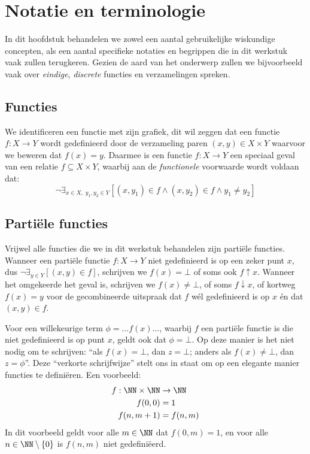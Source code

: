 \chapter{Notatie en terminologie}

In dit hoofdstuk behandelen we zowel een aantal gebruikelijke wiskundige concepten, als een aantal specifieke notaties en begrippen die in dit werkstuk vaak zullen terugkeren. Gezien de aard van het onderwerp zullen we bijvoorbeeld vaak over \emph{eindige}, \emph{discrete} functies en verzamelingen spreken.

\section{Functies}

We identificeren een functie met zijn grafiek, dit wil zeggen dat een functie $f : X \to Y$ wordt gedefinieerd door de verzameling paren $(x, y) \in X \times Y$ waarvoor we beweren dat $f(x) = y$. Daarmee is een functie $f : X \to Y$ een speciaal geval van een relatie $f \subseteq X \times Y$, waarbij aan de \emph{functionele} voorwaarde wordt voldaan dat:
%
\begin{equation*}
  \neg \exists_{x \in X,\; y_1,y_2 \in Y} \left[ (x, y_1) \in f \land (x, y_2) \in f \land y_1 \neq y_2 \right]
\end{equation*}

\section{Partiële functies}

Vrijwel alle functies die we in dit werkstuk behandelen zijn partiële functies. Wanneer een partiële functie $f : X \to Y$ niet gedefinieerd is op een zeker punt $x$, dus $\neg \exists_{y \in Y} [ (x, y) \in f ]$, schrijven we $f(x) = \bot$ of soms ook $f \uparrow x$. Wanneer het omgekeerde het geval is, schrijven we $f(x) \neq \bot$, of soms $f \downarrow x$, of kortweg $f(x) = y$ voor de gecombineerde uitspraak dat $f$ wél gedefinieerd is op $x$ én dat $(x, y) \in f$.

Voor een willekeurige term $\phi = \dots f(x)\dots$, waarbij $f$ een partiële functie is die niet gedefinieerd is op punt $x$, geldt ook dat $\phi = \bot$. Op deze manier is het niet nodig om te schrijven: “als $f(x) = \bot$, dan $z = \bot$; anders als $f(x) \neq \bot$, dan $z = \phi$”. Deze “verkorte schrijfwijze” stelt ons in staat om op een elegante manier functies te definiëren. Een voorbeeld:
\begin{align*}
  f : \NN \times \NN &\to \NN \\
  f(0, 0) &= 1 \\
  f(n, m + 1) &= f(n, m)
\end{align*}
In dit voorbeeld geldt voor alle $m \in \NN$ dat $f(0, m) = 1$, en voor alle $n \in \NN \setminus \{0\}$ is $f(n, m)$ niet gedefiniëerd.

